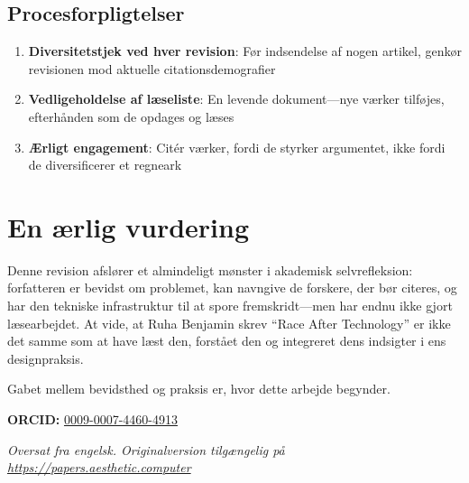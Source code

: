 \documentclass[10pt,letterpaper,twocolumn]{article}
\begin{document}
\subsection{Procesforpligtelser}

\begin{enumerate}
  \item \textbf{Diversitetstjek ved hver revision}: Før indsendelse af nogen artikel, genkør revisionen mod aktuelle citationsdemografier
  \item \textbf{Vedligeholdelse af læseliste}: En levende dokument---nye værker tilføjes, efterhånden som de opdages og læses
  \item \textbf{Ærligt engagement}: Citér værker, fordi de styrker argumentet, ikke fordi de diversificerer et regneark
\end{enumerate}

\section{En ærlig vurdering}

Denne revision afslører et almindeligt mønster i akademisk selvrefleksion: forfatteren er bevidst om problemet, kan navngive de forskere, der bør citeres, og har den tekniske infrastruktur til at spore fremskridt---men har endnu ikke gjort læsearbejdet. At vide, at Ruha Benjamin skrev ``Race After Technology'' er ikke det samme som at have læst den, forstået den og integreret dens indsigter i ens designpraksis.

Gabet mellem bevidsthed og praksis er, hvor dette arbejde begynder.

\vspace{0.5em}
\noindent\textbf{ORCID:} \href{https://orcid.org/0009-0007-4460-4913}{0009-0007-4460-4913}

\vspace{0.5em}\noindent\textit{Oversat fra engelsk. Originalversion tilgængelig på \url{https://papers.aesthetic.computer}}



\end{document}
